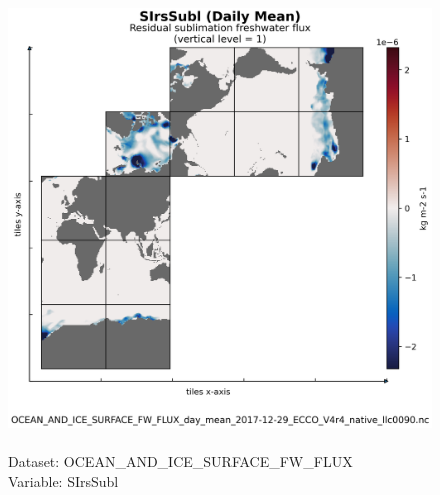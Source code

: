 \begin{figure}[H]
\centering
\includegraphics[scale=0.5]{../images/plots/native_plots/Ocean_and_Sea-Ice_Surface_Freshwater_Fluxes/SIrsSubl.png}
\caption{\\Dataset: OCEAN\_AND\_ICE\_SURFACE\_FW\_FLUX\\Variable: SIrsSubl}
\label{tab:table-OCEAN_AND_ICE_SURFACE_FW_FLUX_SIrsSubl-Plot}
\end{figure}
\pagebreak
